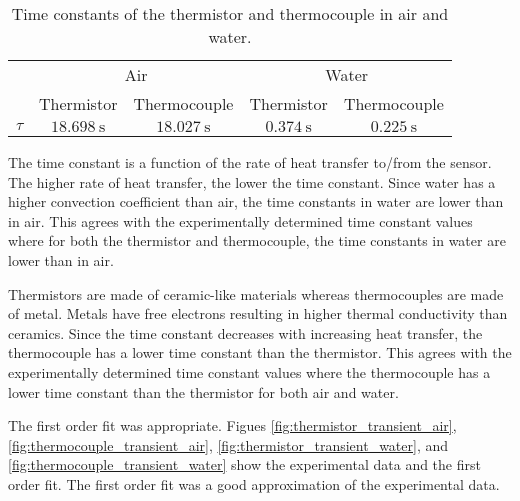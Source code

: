 \begin{table}[h]
    \centering
    \caption{Time constants of the thermistor and thermocouple in air and water.}
    \label{tab:time_constants}
    \begin{tabular}{lcccc}
        \toprule
        & \multicolumn{2}{c}{Air} & \multicolumn{2}{c}{Water} \\
        \cmidrule(lr){2-3} \cmidrule(lr){4-5}
        & Thermistor & Thermocouple & Thermistor & Thermocouple \\
        \midrule
        $\tau$ & $\qty{18.698}{\second}$ & $\qty{18.027}{\second}$ & $\qty{0.374}{\second}$ & $\qty{0.225}{\second}$ \\
        \bottomrule
    \end{tabular}
\end{table}
\noindent The time constant is a function of the rate of heat transfer to/from the sensor. The higher rate of heat transfer, the lower the time constant. 
Since water has a higher convection coefficient than air, the time constants in water are lower than in air. This agrees with the experimentally determined 
time constant values where for both the thermistor and thermocouple, the time constants in water are lower than in air.

Thermistors are made of ceramic-like materials whereas thermocouples are made of metal. Metals have free electrons resulting in higher thermal
conductivity than ceramics. Since the time constant decreases with increasing heat transfer, the thermocouple has a lower time constant than the
thermistor. This agrees with the experimentally determined time constant values where the thermocouple has a lower time constant than the thermistor for
both air and water.

The first order fit was appropriate. Figues \ref{fig:thermistor_transient_air}, \ref{fig:thermocouple_transient_air}, \ref{fig:thermistor_transient_water}, and
\ref{fig:thermocouple_transient_water} show the experimental data and the first order fit. The first order fit was a good approximation of the experimental data.

